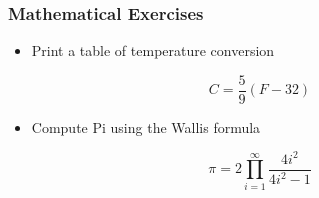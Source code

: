 \documentclass[xcolor=table,10pt,final]{beamer}
\begin{document}
\begin{frame}
  \frametitle{Mathematical Exercises}
  \begin{itemize}
    \item Print a table of temperature conversion
  \end{itemize}
  \vskip1cm
  \begin{equation*}
    C = \frac{5}{9}\left(F - 32\right)
  \end{equation*}
  \begin{itemize}
    \item Compute Pi using the Wallis formula
  \end{itemize}
  \vskip1cm
  \begin{equation*}
    \pi = 2\prod^{\infty}_{i=1}\frac{4i^2}{4i^2-1}
  \end{equation*}
\end{frame}
\end{document}
